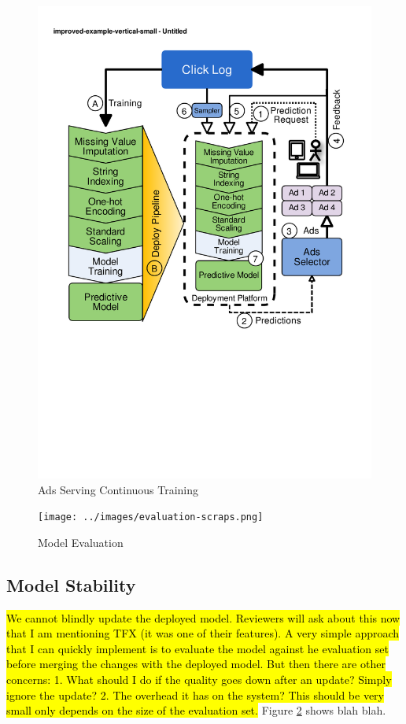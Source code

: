 \begin{figure}[t]
\centering
\includegraphics[width=\columnwidth]{../images/improved-example.pdf}
\caption{Ads Serving Continuous Training}
\label{fig:improved-example}
\end{figure}


\begin{figure}[t]
\centering
\texttt{[image: ../images/evaluation-scraps.png]}
\caption{Model Evaluation}
\label{fig:model-evaluation}
\end{figure}


\subsection{Model Stability}
\hl{We cannot blindly update the deployed model. Reviewers will ask about this now that I am mentioning TFX (it was one of their features).
A very simple approach that I can quickly implement is to evaluate the model against he evaluation set before merging the changes with the deployed model.
But then there are other concerns: 1. What should I do if the quality goes down after an update? Simply ignore the update? 2. The overhead it has on the system? This should be very small only depends on the size of the evaluation set.}
Figure \ref{fig:model-evaluation} shows blah blah.
